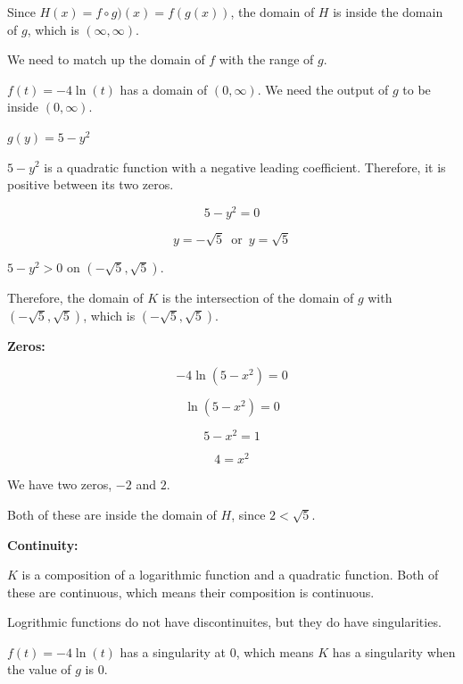 \documentclass{ximera}
\begin{document}
Since $H(x) = f \circ g)(x) = f(g(x))$, the domain of $H$ is inside the domain of $g$, which is $(\infty, \infty)$. 

We need to match up the domain of $f$ with the range of $g$. 


$f(t) = -4 \ln(t)$ has a domain of $(0, \infty)$.  We need the output of $g$ to be inside $(0, \infty)$. 



$g(y) = 5 - y^2$ 



$5 - y^2$ is a quadratic function with a negative leading coefficient.  Therefore, it is positive between its two zeros.


\[
5 - y^2 = 0
\]

\[
y = -\sqrt{5}  \,  \text{ or } \, y = \sqrt{5} 
\]




$5 - y^2 > 0$ on $(-\sqrt{5}, \sqrt{5})$. 




Therefore, the domain of $K$ is the intersection of the domain of $g$ with $(-\sqrt{5}, \sqrt{5})$, which is $(-\sqrt{5}, \sqrt{5})$. 



\textbf{\textcolor{blue!55!black}{Zeros:}} 




\[
-4 \ln(5 - x^2) = 0
\]


\[
 \ln(5 - x^2) = 0
\]


\[
5 - x^2 = 1
\]


\[
4 = x^2
\]


We have two zeros, $-2$ and $2$. 

Both of these are inside the domain of $H$, since $2 < \sqrt{5}$. 













\textbf{\textcolor{blue!55!black}{Continuity:}} 


$K$ is a composition of a logarithmic function and a quadratic function.  Both of these are continuous, which means their composition is continuous. 

Logrithmic functions do not have discontinuites, but they do have singularities.  


$f(t) = -4\ln(t)$ has a singularity at $0$, which means $K$ has a singularity when the value of $g$ is $0$.
\end{document}
